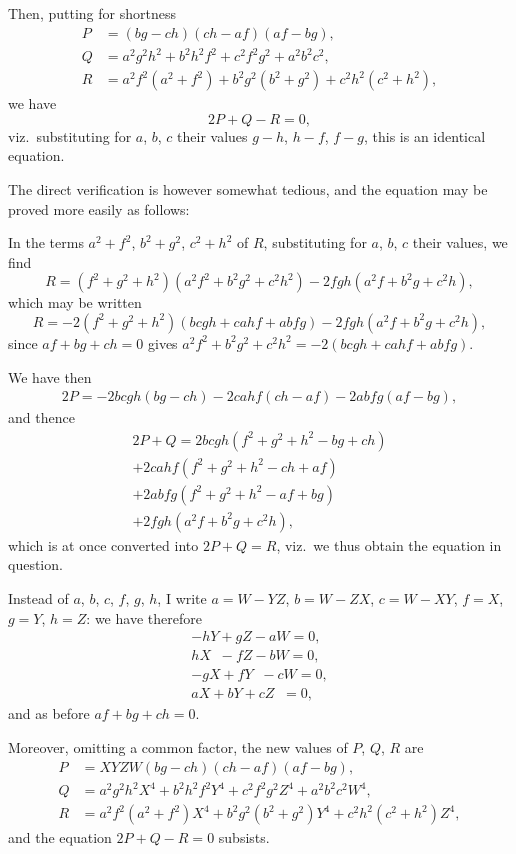 \documentclass[11pt,a4paper]{book}
\begin{document}
Then, putting for shortness
\begin{align*}
P &= (bg - ch)(ch - af)(af - bg), \\
Q &= a^2g^2h^2 + b^2h^2f^2 + c^2f^2g^2 + a^2b^2c^2, \\
R &= a^2f^2(a^2 + f^2) + b^2g^2(b^2 + g^2) + c^2h^2(c^2 + h^2),
\end{align*}
we have
\[
2P + Q - R = 0,
\]
viz.\ substituting for $a$, $b$, $c$ their values $g-h$, $h-f$, $f-g$, this is an identical equation.

The direct verification is however somewhat tedious, and the equation may be proved more easily as follows:

In the terms $a^2 + f^2$, $b^2 + g^2$, $c^2 + h^2$ of $R$, substituting for $a$, $b$, $c$ their values, we find
\[
R = (f^2 + g^2 + h^2)(a^2f^2 + b^2g^2 + c^2h^2) - 2fgh(a^2f + b^2g + c^2h),
\]
which may be written
\[
R = -2(f^2 + g^2 + h^2)(bcgh + cahf + abfg) - 2fgh(a^2f + b^2g + c^2h),
\]
since $af + bg + ch = 0$ gives $a^2f^2 + b^2g^2 + c^2h^2 = -2(bcgh + cahf + abfg)$.

\newpage

We have then
\begin{multline*}
2P = -2bcgh(bg - ch) - 2cahf(ch - af) - 2abfg(af - bg),
\end{multline*}
and thence
\begin{multline*}
2P + Q = 2bcgh(f^2 + g^2 + h^2 - bg + ch) \\
+ 2cahf(f^2 + g^2 + h^2 - ch + af) \\
+ 2abfg(f^2 + g^2 + h^2 - af + bg) \\
+ 2fgh(a^2f + b^2g + c^2h),
\end{multline*}
which is at once converted into $2P + Q = R$, viz.\ we thus obtain the equation in question.

\newpage

Instead of $a$, $b$, $c$, $f$, $g$, $h$, I write $a = W - YZ$, $b = W - ZX$, $c = W - XY$, $f = X$, $g = Y$, $h = Z$: we have therefore
\begin{gather*}
-hY + gZ - aW = 0, \\
hX \;\; - fZ - bW = 0, \\
-gX + fY \;\; - cW = 0, \\
aX + bY + cZ \;\; = 0,
\end{gather*}
and as before $af + bg + ch = 0$.

Moreover, omitting a common factor, the new values of $P$, $Q$, $R$ are
\begin{align*}
P &= XYZW(bg - ch)(ch - af)(af - bg), \\
Q &= a^2g^2h^2X^4 + b^2h^2f^2Y^4 + c^2f^2g^2Z^4 + a^2b^2c^2W^4, \\
R &= a^2f^2(a^2 + f^2)X^4 + b^2g^2(b^2 + g^2)Y^4 + c^2h^2(c^2 + h^2)Z^4,
\end{align*}
and the equation $2P + Q - R = 0$ subsists.
\end{document}
